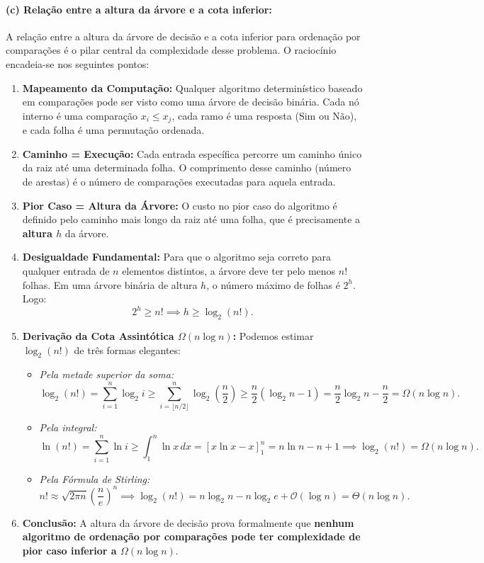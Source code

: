 \documentclass[11pt,a4paper]{article}
\begin{document}
\paragraph{(c) Relação entre a altura da árvore e a cota inferior:}
A relação entre a altura da árvore de decisão e a cota inferior para ordenação por comparações é o pilar central da complexidade desse problema. O raciocínio encadeia-se nos seguintes pontos:
\begin{enumerate}
    \item \textbf{Mapeamento da Computação:} Qualquer algoritmo determinístico baseado em comparações pode ser visto como uma árvore de decisão binária. Cada nó interno é uma comparação $x_i \le x_j$, cada ramo é uma resposta ($\text{Sim}$ ou $\text{Não}$), e cada folha é uma permutação ordenada.
    \item \textbf{Caminho = Execução:} Cada entrada específica percorre um caminho único da raiz até uma determinada folha. O comprimento desse caminho (número de arestas) é o número de comparações executadas para aquela entrada.
    \item \textbf{Pior Caso = Altura da Árvore:} O custo no pior caso do algoritmo é definido pelo caminho mais longo da raiz até uma folha, que é precisamente a \textbf{altura $h$} da árvore.
    \item \textbf{Desigualdade Fundamental:} Para que o algoritmo seja correto para qualquer entrada de $n$ elementos distintos, a árvore deve ter pelo menos $n!$ folhas. Em uma árvore binária de altura $h$, o número máximo de folhas é $2^h$. Logo:
    \[
        2^h \ge n! \implies h \ge \log_2(n!).
    \]
    \item \textbf{Derivação da Cota Assintótica $\Omega(n \log n)$:}
    Podemos estimar $\log_2(n!)$ de três formas elegantes:
    \begin{itemize}
        \item \textit{Pela metade superior da soma:}
        \[
            \log_2(n!) = \sum_{i=1}^n \log_2 i \ge \sum_{i=\lfloor n/2 \rfloor}^n \log_2\left(\frac{n}{2}\right) \ge \frac{n}{2}(\log_2 n - 1) = \frac{n}{2}\log_2 n - \frac{n}{2} = \Omega(n \log n).
        \]
        \item \textit{Pela integral:}
        \[
            \ln(n!) = \sum_{i=1}^n \ln i \ge \int_1^n \ln x \, dx = [x \ln x - x]_1^n = n \ln n - n + 1 \implies \log_2(n!) = \Omega(n \log n).
        \]
        \item \textit{Pela Fórmula de Stirling:}
        \[
            n! \approx \sqrt{2\pi n}\left(\frac{n}{e}\right)^n \implies \log_2(n!) = n \log_2 n - n \log_2 e + \mathcal{O}(\log n) = \Theta(n \log n).
        \]
    \end{itemize}
    \item \textbf{Conclusão:} A altura da árvore de decisão prova formalmente que \textbf{nenhum algoritmo de ordenação por comparações pode ter complexidade de pior caso inferior a $\Omega(n \log n)$}.
\end{enumerate}
\end{document}
